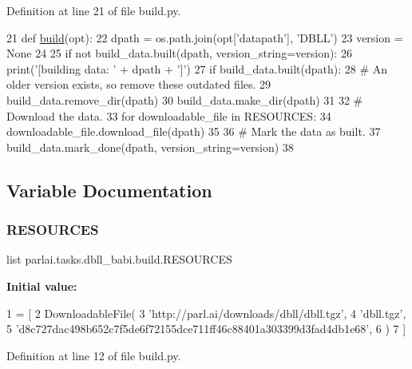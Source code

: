 Definition at line 21 of file build.\+py.


\begin{DoxyCode}
21 \textcolor{keyword}{def }\hyperlink{namespacedialog__babi__feedback_1_1build_a7a9d289f7493a5ded13c4b7f071b6184}{build}(opt):
22     dpath = os.path.join(opt[\textcolor{stringliteral}{'datapath'}], \textcolor{stringliteral}{'DBLL'})
23     version = \textcolor{keywordtype}{None}
24 
25     \textcolor{keywordflow}{if} \textcolor{keywordflow}{not} build\_data.built(dpath, version\_string=version):
26         print(\textcolor{stringliteral}{'[building data: '} + dpath + \textcolor{stringliteral}{']'})
27         \textcolor{keywordflow}{if} build\_data.built(dpath):
28             \textcolor{comment}{# An older version exists, so remove these outdated files.}
29             build\_data.remove\_dir(dpath)
30         build\_data.make\_dir(dpath)
31 
32         \textcolor{comment}{# Download the data.}
33         \textcolor{keywordflow}{for} downloadable\_file \textcolor{keywordflow}{in} RESOURCES:
34             downloadable\_file.download\_file(dpath)
35 
36         \textcolor{comment}{# Mark the data as built.}
37         build\_data.mark\_done(dpath, version\_string=version)
38 \end{DoxyCode}


\subsection{Variable Documentation}
\mbox{\label{namespaceparlai_1_1tasks_1_1dbll__babi_1_1build_a37514f5c86d5523b75f341f02bac1f6f}} 
\subsubsection{\texorpdfstring{R\+E\+S\+O\+U\+R\+C\+ES}{RESOURCES}}
{\footnotesize\ttfamily list parlai.\+tasks.\+dbll\+\_\+babi.\+build.\+R\+E\+S\+O\+U\+R\+C\+ES}

{\bfseries Initial value\+:}
\begin{DoxyCode}
1 =  [
2     DownloadableFile(
3         \textcolor{stringliteral}{'http://parl.ai/downloads/dbll/dbll.tgz'},
4         \textcolor{stringliteral}{'dbll.tgz'},
5         \textcolor{stringliteral}{'d8c727dac498b652c7f5de6f72155dce711ff46c88401a303399d3fad4db1e68'},
6     )
7 ]
\end{DoxyCode}


Definition at line 12 of file build.\+py.

